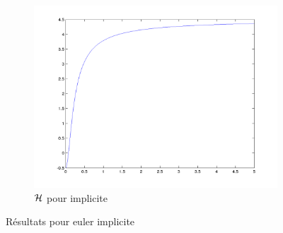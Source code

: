 \begin{figure}
\begin{subfigure}[b]{0.45\textwidth}
    \includegraphics[width=\textwidth]{images/Q1_implicite_H.png}
    \caption{$\mathcal{H}$ pour implicite}
    \label{fig:q1_implicite_H}
  \end{subfigure}
  \caption{Résultats pour euler implicite}\label{fig:q1_implicite}
\end{figure}
